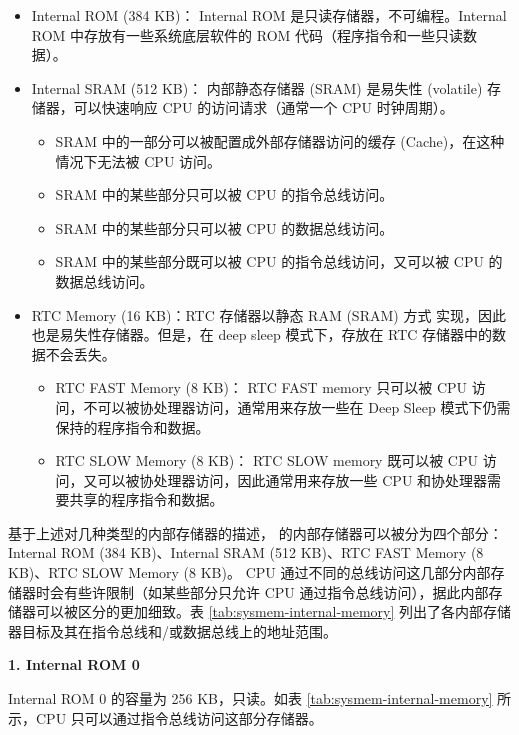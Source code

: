 \documentclass[main\_\_CN.tex]{subfiles}
\begin{document}
\begin{itemize}
    \item Internal ROM (384 KB)：
    Internal ROM 是只读存储器，不可编程。Internal ROM 中存放有一些系统底层软件的 ROM 代码（程序指令和一些只读数据）。
    \item Internal SRAM (512 KB)：
    内部静态存储器 (SRAM) 是易失性 (volatile) 存储器，可以快速响应 CPU 的访问请求（通常一个 CPU 时钟周期）。
    \begin{itemize}
        \item SRAM 中的一部分可以被配置成外部存储器访问的缓存 (Cache)，在这种情况下无法被 CPU 访问。
        \item SRAM 中的某些部分只可以被 CPU 的指令总线访问。
        \item SRAM 中的某些部分只可以被 CPU 的数据总线访问。
        \item SRAM 中的某些部分既可以被 CPU 的指令总线访问，又可以被 CPU 的数据总线访问。
    \end{itemize}
    \item RTC Memory (16 KB)：RTC 存储器以静态 RAM (SRAM) 方式 实现，因此也是易失性存储器。但是，在 deep sleep 模式下，存放在 RTC 存储器中的数据不会丢失。
    \begin{itemize}
        \item RTC FAST Memory (8 KB)：
        RTC FAST memory 只可以被 CPU 访问，不可以被协处理器访问，通常用来存放一些在 Deep Sleep 模式下仍需保持的程序指令和数据。

        \item RTC SLOW Memory (8 KB)：
        RTC SLOW memory 既可以被 CPU 访问，又可以被协处理器访问，因此通常用来存放一些 CPU 和协处理器需要共享的程序指令和数据。
    \end{itemize}
\end{itemize}

基于上述对几种类型的内部存储器的描述，\chipname{} 的内部存储器可以被分为四个部分：Internal ROM (384 KB)、Internal SRAM (512 KB)、RTC FAST Memory (8 KB)、RTC SLOW Memory (8 KB)。
CPU 通过不同的总线访问这几部分内部存储器时会有些许限制（如某些部分只允许 CPU 通过指令总线访问），据此内部存储器可以被区分的更加细致。表 \ref{tab:sysmem-internal-memory} 列出了各内部存储器目标及其在指令总线和/或数据总线上的地址范围。








{\bfseries 1. Internal ROM 0}

Internal ROM 0 的容量为 256 KB，只读。如表 \ref{tab:sysmem-internal-memory} 所示，CPU 只可以通过指令总线访问这部分存储器。
\end{document}
